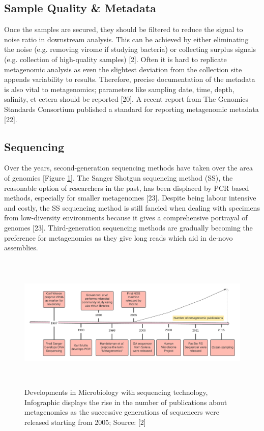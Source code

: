 \subsection{Sample Quality \& Metadata}
Once the samples are secured, they should be filtered to reduce the signal to noise ratio in downstream analysis. This can be achieved by either eliminating the noise (e.g. removing virome if studying bacteria) or collecting surplus signals (e.g. collection of high-quality samples) [2]. Often it is hard to replicate metagenomic analysis as even the slightest deviation from the collection site appends variability to results. Therefore, precise documentation of the metadata is also vital to metagenomics; parameters like sampling date, time, depth, salinity, et cetera should be reported [20]. A recent report from The Genomics Standards Consortium published a standard for reporting metagenomic metadata [22].

\subsection{Sequencing}
Over the years, second-generation sequencing methods have taken over the area of genomics [Figure \ref{fig:figure2}]. The Sanger Shotgun sequencing method (SS), the reasonable option of researchers in the past, has been displaced by PCR based methods, especially for smaller metagenomes [23]. Despite being labour intensive and costly, the SS sequencing method is still fancied when dealing with specimens from low-diversity environments because it gives a comprehensive portrayal of genomes [23]. Third-generation sequencing methods are gradually becoming the preference for metagenomics as they give long reads which aid in de-novo assemblies.

\begin{figure}
  \centering
  \includegraphics[width=15cm, height=6.5cm]{../figures/Figure2.png}
  \caption{Developments in Microbiology with sequencing technology, Infographic displays the rise in the number of publications about metagenomics as the successive generations of sequencers were released starting from 2005; Source: [2]}
  \label{fig:figure2}
\end{figure}

